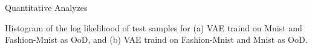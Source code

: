 \documentclass{article}
\begin{document}
\begin{adjustwidth}{-100pt}{-100pt}
\begin{singlespace}
\begin{tcolorbox}[title=\textbf{Model Card},
    breakable, sharp corners, boxrule=0.7pt]
{\begin{mcsection}{Quantitative Analyzes}
    \item Histogram of the log likelihood of test samples for (a) VAE traind on Mnist and Fashion-Mnist as OoD, and (b) VAE traind on Fashion-Mnist and Mnist as OoD.
\end{mcsection}


} %
\end{tcolorbox}
\end{singlespace}
\end{adjustwidth}
\end{document}
